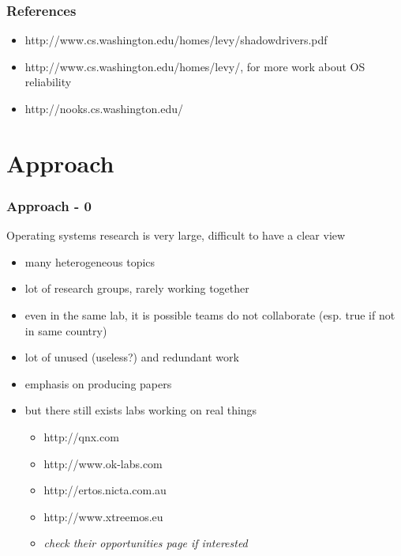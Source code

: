 \begin{frame}
  \frametitle{References}
  \begin{itemize}
    \item http://www.cs.washington.edu/homes/levy/shadowdrivers.pdf
    \item http://www.cs.washington.edu/homes/levy/, for more work about OS reliability
    \item http://nooks.cs.washington.edu/
  \end{itemize}
\end{frame}


%
%

\section{Approach}

\begin{frame}
  \frametitle{Approach - 0}
  Operating systems research is very large, difficult to have a clear view

  \begin{itemize}
    \item
      many heterogeneous topics
    \item
      lot of research groups, rarely working together
    \item
      even in the same lab, it is possible teams do not collaborate (esp. true if not in same country)
    \item
      lot of unused (useless?) and redundant work
    \item
      emphasis on producing papers
    \item
      but there still exists labs working on real things
      \begin{itemize}
	\item
	  http://qnx.com
	\item
          http://www.ok-labs.com
        \item
	  http://ertos.nicta.com.au
        \item
	  http://www.xtreemos.eu
	\item
	  \textit{check their opportunities page if interested}
      \end{itemize}
  \end{itemize}
\end{frame}

